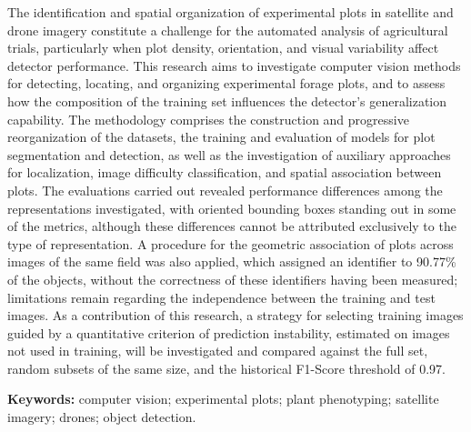 The identification and spatial organization of experimental plots in satellite and drone imagery constitute a challenge for the automated analysis of agricultural trials, particularly when plot density, orientation, and visual variability affect detector performance. This research aims to investigate computer vision methods for detecting, locating, and organizing experimental forage plots, and to assess how the composition of the training set influences the detector's generalization capability. The methodology comprises the construction and progressive reorganization of the datasets, the training and evaluation of models for plot segmentation and detection, as well as the investigation of auxiliary approaches for localization, image difficulty classification, and spatial association between plots. The evaluations carried out revealed performance differences among the representations investigated, with oriented bounding boxes standing out in some of the metrics, although these differences cannot be attributed exclusively to the type of representation. A procedure for the geometric association of plots across images of the same field was also applied, which assigned an identifier to 90.77\% of the objects, without the correctness of these identifiers having been measured; limitations remain regarding the independence between the training and test images. As a contribution of this research, a strategy for selecting training images guided by a quantitative criterion of prediction instability, estimated on images not used in training, will be investigated and compared against the full set, random subsets of the same size, and the historical F1-Score threshold of 0.97.

\textbf{Keywords:} computer vision; experimental plots; plant phenotyping; satellite imagery; drones; object detection.
